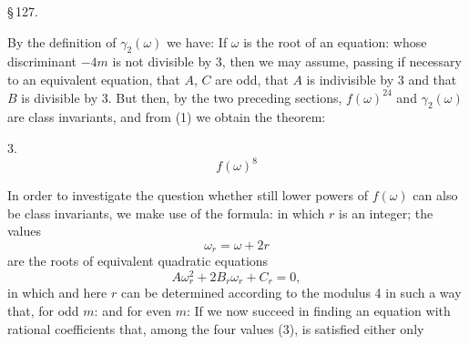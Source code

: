 

\S\,127. \textbf{}

By the definition of $\gamma_2(\omega)$ we have:
If $\omega$ is the root of an equation:
whose discriminant $-4m$ is not divisible by 3, then we may assume, passing if necessary to an equivalent equation, that $A$, $C$ are odd, that $A$ is indivisible by 3 and that $B$ is divisible by 3. But then, by the two preceding sections, $f(\omega)^{24}$ and $\gamma_2(\omega)$ are class invariants, and from (1) we obtain the theorem:

3. 
\[
f(\omega)^8
\]

In order to investigate the question whether still lower powers of $f(\omega)$ can also be class invariants, we make use of the formula:
in which $r$ is an integer; the values
\[
\omega_r=\omega+2r
\]
are the roots of equivalent quadratic equations
\[
A\omega_r^2+2B_r\omega_r+C_r=0,
\]
in which
and here $r$ can be determined according to the modulus 4 in such a way that, for odd $m$:
and for even $m$:
If we now succeed in finding an equation with rational coefficients that, among the four values (3), is satisfied either only
